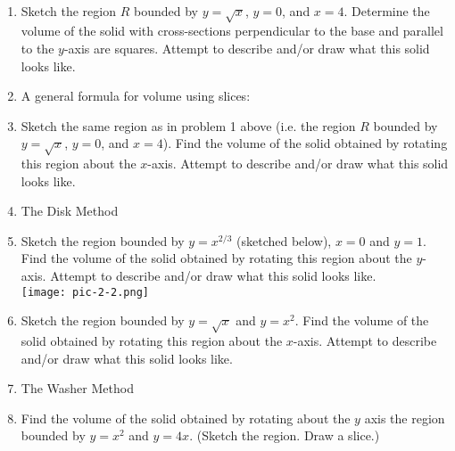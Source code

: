 \documentclass[11pt,fleqn]{article}
\begin{document}
\renewcommand{\headrulewidth}{0pt}
\newcommand{\blank}[1]{\rule{#1}{0.75pt}}
\newcommand{\bc}{\begin{center}}
\newcommand{\ec}{\end{center}}
\renewcommand{\d}{\displaystyle}

\vspace*{-0.7in}

\begin{center}
  \large
  \\
\end{center}

\begin{enumerate}
\item Sketch the region $R$ bounded by $y=\sqrt{x}$, $y=0$, and $x=4.$ Determine the volume of the solid with cross-sections perpendicular to the base and parallel to the $y$-axis are squares. Attempt to describe and/or draw what this solid looks like.\\
\vfill

\item A general formula for volume using slices:

\vspace{1in}

\item Sketch the same region as in problem 1 above (i.e. the region $R$ bounded by $y=\sqrt{x}$, $y=0$, and $x=4$). Find the volume of the solid obtained by rotating this region about the $x$-axis. Attempt to describe and/or draw what this solid looks like.\\

\vfill

\item The Disk Method

\vspace{1.5in}
\newpage
\item Sketch the region bounded by $y=x^{2/3}$ (sketched below), $x=0$ and $y=1.$ Find the volume of the solid obtained by rotating this region about the $y$-axis. Attempt to describe and/or draw what this solid looks like.\\

\texttt{[image: pic-2-2.png]}
\vfill
\item Sketch the region bounded by $y=\sqrt{x}$ and $y=x^2$. Find the volume of the solid obtained by rotating this region about the $x$-axis. Attempt to describe and/or draw what this solid looks like.\\

\vfill

\item The Washer Method

\vspace{1in}


\item Find the volume of the solid obtained by rotating about the $y$ axis the region bounded by $y=x^2$ and $y=4x.$ (Sketch the region. Draw a slice.)
\vfill
\end{enumerate}
\end{document}
